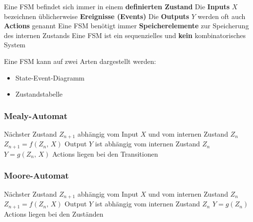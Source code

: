 \vspace{0.1cm}

\begin{outline}
    \1 Eine FSM befindet sich immer in einem \textbf{definierten Zustand}
    \1 Die \textbf{Inputs} $X$ bezeichnen üblicherweise \textbf{Ereignisse (Events)}
    \1 Die \textbf{Outputs} $Y$ werden oft auch \textbf{Actions} genannt
    \1 Eine FSM benötigt immer \textbf{Speicherelemente} zur Speicherung des internen Zustands
        \2 Eine FSM ist ein sequenzielles und \textbf{kein} kombinatorisches System
\end{outline}

\vspace{0.2cm}

Eine FSM kann auf zwei Arten dargestellt werden:

\vspace{0.1cm}

\begin{minipage}[t]{0.48\columnwidth}
    \begin{itemize}
        \item State-Event-Diagramm
    \end{itemize}
\end{minipage}
\hfill
\begin{minipage}[t]{0.48\columnwidth}
    \begin{itemize}
        \item Zustandstabelle
    \end{itemize}
\end{minipage}


\subsubsection{Mealy-Automat}

\begin{outline}
    \1 Nächster Zustand $Z_{n+1}$ abhängig vom Input $X$ und vom internen Zustand $Z_n$
        \2 $Z_{n+1} = f(Z_n, \, X)$
    \1 Output $Y$ ist abhängig vom internen Zustand $Z_n$ \textbf{}
        \2 $Y = g(Z_n , \, X)$
    \1 Actions liegen bei den Transitionen
\end{outline}


\subsubsection{Moore-Automat}

\begin{outline}
    \1 Nächster Zustand $Z_{n+1}$ abhängig vom Input $X$ und vom internen Zustand $Z_n$
        \2 $Z_{n+1} = f(Z_n, \, X)$
    \1 Output $Y$ ist \textbf{} abhängig vom internen Zustand $Z_n$ 
        \2 $Y = g(Z_n)$
    \1 Actions liegen bei den Zuständen
\end{outline}

